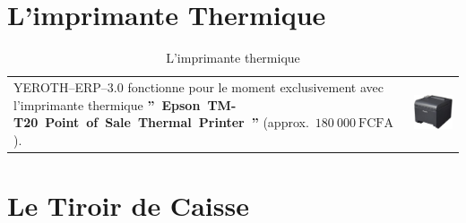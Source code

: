 \documentclass[12pt, a4paper]{article}
\newcommand{\yerotherp}{\textcolor{yerenColorBlue}{\sc YEROTH--ERP--$3.0$}\xspace}
\newcommand{\money}[1]{$#1\ \text{FCFA}$}
\begin{document}
\vspace{-1.5em}
\section{L'imprimante Thermique}
\vspace{-2.5em}

\begin{table}[!htbp]
\begin{tabular}{lr}
\parbox{25em}{
\yerotherp fonctionne pour le moment
exclusivement avec l'imprimante thermique
\textbf{''~Epson~TM-T20~Point~of~Sale~Thermal~Printer~''}
(approx.~\money{180~000}).
\vspace{-3em}
}

&

\parbox{17em}{
\begin{center}
\includegraphics[scale=0.27]{images/epson-tm-t20-pos-thermal-printer.png}
\caption*{L'imprimante thermique}
\end{center}
}
\end{tabular}
\end{table}

\vspace{-1.5em}
\section{Le Tiroir de Caisse}
\vspace{-2.5em}
\end{document}
